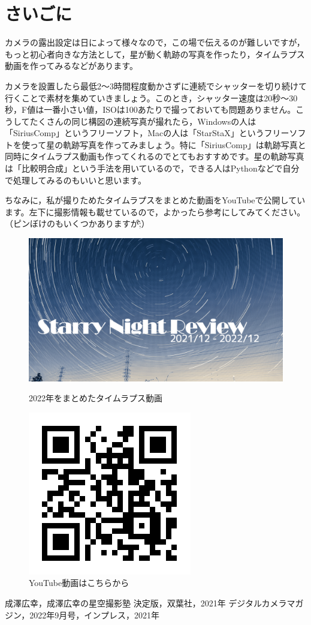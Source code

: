 \documentclass[supernova_2023]{subfiles}
\begin{document}
\section{さいごに}
カメラの露出設定は日によって様々なので，この場で伝えるのが難しいですが，もっと初心者向きな方法として，星が動く軌跡の写真を作ったり，タイムラプス動画を作ってみるなどがあります。

カメラを設置したら最低2～3時間程度動かさずに連続でシャッターを切り続けて行くことで素材を集めていきましょう。このとき，シャッター速度は20秒～30秒，F値は一番小さい値，ISOは100あたりで撮っておいても問題ありません。こうしてたくさんの同じ構図の連続写真が撮れたら，Windowsの人は「SiriusComp」というフリーソフト，Macの人は「StarStaX」というフリーソフトを使って星の軌跡写真を作ってみましょう。特に「SiriusComp」は軌跡写真と同時にタイムラプス動画も作ってくれるのでとてもおすすめです。星の軌跡写真は「比較明合成」という手法を用いているので，できる人はPythonなどで自分で処理してみるのもいいと思います。

ちなみに，私が撮りためたタイムラプスをまとめた動画をYouTubeで公開しています。左下に撮影情報も載せているので，よかったら参考にしてみてください。（ピンぼけのもいくつかありますが\^\^;）
\begin{figure}[H]
  \centering
  \begin{minipage}{0.4\columnwidth}
    \centering
    \includegraphics[width=.8\columnwidth]{figures/Yosuke/Starry_Night_Review_thumbnail.png}
    \caption{2022年をまとめたタイムラプス動画}
    \label{fig:starry}
  \end{minipage}
  \begin{minipage}{0.4\columnwidth}
    \centering
    \includegraphics[width=.5\columnwidth]{figures/Yosuke/QR_031871.png}
    \caption{YouTube動画はこちらから}
    \label{fig:QR}
  \end{minipage}
\end{figure}

\begin{thebibliography}{1}
   成澤広幸，成澤広幸の星空撮影塾 決定版，双葉社，2021年
   デジタルカメラマガジン，2022年9月号，インプレス，2021年
\end{thebibliography}
\end{document}
